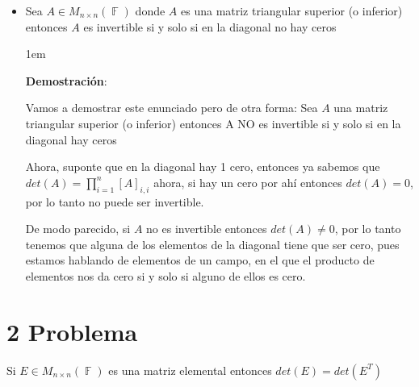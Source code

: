 \documentclass[12pt, fleqn]{article}                             %
\newenvironment{SmallIndentation}[1][0.75em]                    %
        {\begin{adjustwidth}{#1}{}\begin{footnotesize}}             %
        {\end{footnotesize}\end{adjustwidth}}                       %
\theoremstyle{break}                                            %
\DeclareMathOperator \GenericField {\mathbb{F}}                 %
\begin{document}
\begin{itemize}
        \item
            Sea $A \in M_{n \times n}(\GenericField)$ donde $A$ es una matriz triangular
            superior (o inferior) entonces $A$ es invertible si y solo si en la diagonal no hay ceros

            \begin{SmallIndentation}[1em]
                \textbf{Demostración}:

                Vamos a demostrar este enunciado pero de otra forma: Sea $A$ una matriz triangular
                superior (o inferior) entonces A NO es invertible si y solo si en la diagonal hay ceros
                
                Ahora, suponte que en la diagonal hay 1 cero, entonces ya sabemos que 
                $det(A) = \prod_{i = 1}^n [A]_{i, i}$ ahora, si hay un cero por ahí entonces
                $det(A) = 0$, por lo tanto no puede ser invertible.

                De modo parecido, si $A$ no es invertible entonces $det(A) \neq 0$, por lo tanto
                tenemos que alguna de los elementos de la diagonal tiene que ser cero, pues estamos hablando
                de elementos de un campo, en el que el producto de elementos nos da cero si y solo si alguno de 
                ellos es cero.

            \end{SmallIndentation}
   \end{itemize}



\clearpage
\section{2 Problema}

    Si $E \in M_{n \times n}(\GenericField)$ es una matriz elemental
    entonces $det(E) = det(E^T)$
\end{document}
